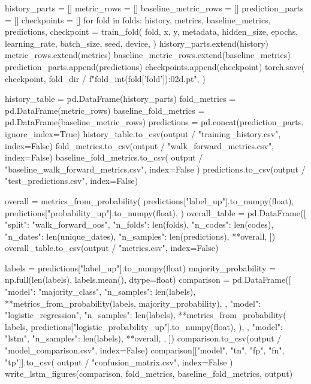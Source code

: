 \documentclass[UTF8,a4paper,fontset=fandol]{ctexart}
\begin{document}
\begin{ProjectCode}
{{    history_parts = []
    metric_rows = []
    baseline_metric_rows = []
    prediction_parts = []
    checkpoints = []
    for fold in folds:
        history, metrics, baseline_metrics, predictions, checkpoint = train_fold(
            fold,
            x,
            y,
            metadata,
            hidden_size,
            epochs,
            learning_rate,
            batch_size,
            seed,
            device,
        )
        history_parts.extend(history)
        metric_rows.extend(metrics)
        baseline_metric_rows.extend(baseline_metrics)
        prediction_parts.append(predictions)
        checkpoints.append(checkpoint)
        torch.save(
            checkpoint,
            fold_dir / f"fold_{int(fold['fold']):02d}.pt",
        )

    history_table = pd.DataFrame(history_parts)
    fold_metrics = pd.DataFrame(metric_rows)
    baseline_fold_metrics = pd.DataFrame(baseline_metric_rows)
    predictions = pd.concat(prediction_parts, ignore_index=True)
    history_table.to_csv(output / "training_history.csv", index=False)
    fold_metrics.to_csv(output / "walk_forward_metrics.csv", index=False)
    baseline_fold_metrics.to_csv(
        output / "baseline_walk_forward_metrics.csv", index=False
    )
    predictions.to_csv(output / "test_predictions.csv", index=False)

    overall = metrics_from_probability(
        predictions["label_up"].to_numpy(float),
        predictions["probability_up"].to_numpy(float),
    )
    overall_table = pd.DataFrame([{
        "split": "walk_forward_oos",
        "n_folds": len(folds),
        "n_codes": len(codes),
        "n_dates": len(unique_dates),
        "n_samples": len(predictions),
        **overall,
    }])
    overall_table.to_csv(output / "metrics.csv", index=False)

    labels = predictions["label_up"].to_numpy(float)
    majority_probability = np.full(len(labels), labels.mean(), dtype=float)
    comparison = pd.DataFrame([
        {
            "model": "majority_class",
            "n_samples": len(labels),
            **metrics_from_probability(labels, majority_probability),
        },
        {
            "model": "logistic_regression",
            "n_samples": len(labels),
            **metrics_from_probability(
                labels,
                predictions["logistic_probability_up"].to_numpy(float),
            ),
        },
        {
            "model": "lstm",
            "n_samples": len(labels),
            **overall,
        },
    ])
    comparison.to_csv(output / "model_comparison.csv", index=False)
    comparison[["model", "tn", "fp", "fn", "tp"]].to_csv(
        output / "confusion_matrix.csv", index=False
    )
    write_lstm_figures(comparison, fold_metrics, baseline_fold_metrics, output)

}}
\end{ProjectCode}
\end{document}
